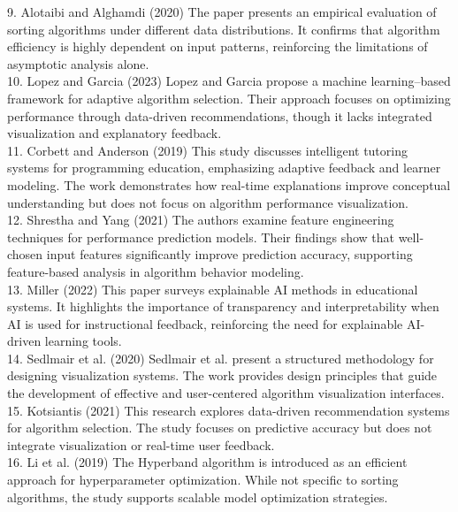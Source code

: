 \documentclass[12pt,a4paper,oneside,openany]{report}
\begin{document}
9. Alotaibi and Alghamdi (2020) \cite{Alotaibi2020}
The paper presents an empirical evaluation of sorting algorithms under different data distributions. It confirms that algorithm efficiency is highly dependent on input patterns, reinforcing the limitations of asymptotic analysis alone.\\

10. Lopez and Garcia (2023) \cite{Lopez2023}
Lopez and Garcia propose a machine learning–based framework for adaptive algorithm selection. Their approach focuses on optimizing performance through data-driven recommendations, though it lacks integrated visualization and explanatory feedback.\\

11. Corbett and Anderson (2019) \cite{Corbett2019}
This study discusses intelligent tutoring systems for programming education, emphasizing adaptive feedback and learner modeling. The work demonstrates how real-time explanations improve conceptual understanding but does not focus on algorithm performance visualization.\\

12. Shrestha and Yang (2021) \cite{Shrestha2021}
The authors examine feature engineering techniques for performance prediction models. Their findings show that well-chosen input features significantly improve prediction accuracy, supporting feature-based analysis in algorithm behavior modeling.\\

13. Miller (2022) \cite{Miller2022}
This paper surveys explainable AI methods in educational systems. It highlights the importance of transparency and interpretability when AI is used for instructional feedback, reinforcing the need for explainable AI-driven learning tools.\\

14. Sedlmair et al. (2020) \cite{Sedlmair2020}
Sedlmair et al. present a structured methodology for designing visualization systems. The work provides design principles that guide the development of effective and user-centered algorithm visualization interfaces.\\

15. Kotsiantis (2021) \cite{Kotsiantis2021}
This research explores data-driven recommendation systems for algorithm selection. The study focuses on predictive accuracy but does not integrate visualization or real-time user feedback.\\

16. Li et al. (2019) \cite{Li2019}
The Hyperband algorithm is introduced as an efficient approach for hyperparameter optimization. While not specific to sorting algorithms, the study supports scalable model optimization strategies.\\
\end{document}
